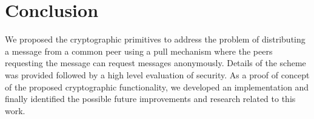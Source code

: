 \section{Conclusion}
We proposed the cryptographic primitives to address the problem of distributing a message from a common peer using a pull mechanism where the peers requesting the message can request messages anonymously. Details of the scheme was provided followed by a high level evaluation of security. As a proof of concept of the proposed cryptographic functionality, we developed an implementation and finally identified the possible future improvements and research related to this work.
